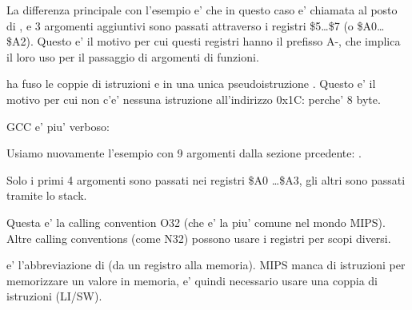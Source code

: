 


La differenza principale con l'esempio \q{\HelloWorldSectionName} e' che in questo caso \printf e' chiamata 
al posto di \puts, e 3 argomenti aggiuntivi sono passati attraverso i registri \$5\dots \$7 (o \$A0\dots \$A2).
Questo e' il motivo per cui questi registri hanno il prefisso A-, che implica il loro uso per il passaggio di argomenti di funzioni.





\IDA ha fuso le coppie di istruzioni  e  in una unica pseudoistruzione .
Questo e' il motivo per cui non c'e' nessuna istruzione all'indirizzo 0x1C: perche'   8 byte.%


\NonOptimizing GCC e' piu' verboso:






Usiamo nuovamente l'esempio con 9 argomenti dalla sezione prcedente: .




Solo i primi 4 argomenti sono passati nei registri \$A0 \dots \$A3, gli altri sono passati tramite lo stack.

Questa e' la calling convention O32 (che e' la piu' comune nel mondo MIPS).
Altre calling conventions (come N32) possono usare i registri per scopi diversi.


 e' l'abbreviazione di  (da un registro alla memoria).
MIPS manca di istruzioni per memorizzare un valore in memoria, e' quindi necessario usare una coppia di istruzioni (LI/SW).

